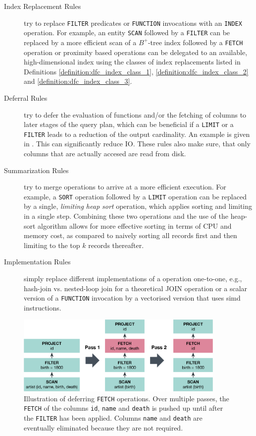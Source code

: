 \begin{description}
    \item[Index Replacement Rules] try to replace \texttt{FILTER} predicates or \texttt{FUNCTION} invocations with an  \texttt{INDEX} operation. For example, an entity \texttt{SCAN} followed by a \texttt{FILTER} can be replaced by a more efficient scan of a $B^{+}$-tree index followed by a \texttt{FETCH} operation or proximity based operations can be delegated to an available, high-dimensional index using the classes of index replacements listed in Definitions \ref{definition:dfc_index_class_1}, \ref{definition:dfc_index_class_2} and \ref{definition:dfc_index_class_3}.
 
    \item[Deferral Rules] try to defer the evaluation of functions and/or the fetching of columns to later stages of the query plan, which can be beneficial if a \texttt{LIMIT} or a \texttt{FILTER} leads to a reduction of the output cardinality. An example is given in . This can significantly reduce IO. These rules also make sure, that only columns that are actually accesed are read from disk.

    \item[Summarization Rules]try to merge operations to arrive at a more efficient execution. For example, a \texttt{SORT} operation followed by a  \texttt{LIMIT} operation can be replaced by a single, \emph{limiting heap sort} operation, which applies sorting and limiting in a single step. Combining these two operations and the use of the heap-sort algorithm allows for more effective sorting in terms of CPU and memory cost, as compared to naively sorting all records first and then limiting to the top $k$ records thereafter.
    
    \item[Implementation Rules] simply replace different implementations of a operation one-to-one, e.g., hash-join vs. nested-loop join for a theoretical JOIN operation or a scalar version of a \texttt{FUNCTION} invocation by a vectorised version that uses \acrshort{simd} instructions.
\end{description}


\begin{figure}[bt]
    \centering
    \includegraphics[width=0.9\textwidth]{figures/physical-rule-fetch}
    \caption{Illustration of deferring \texttt{FETCH} operations. Over multiple passes, the \texttt{FETCH} of the columns \texttt{id}, \texttt{name} and \texttt{death} is pushed up until after the \texttt{FILTER} has been applied. Columns \texttt{name} and \texttt{death} are eventually eliminated because they are not required.}
    \label{figure:cottontail_physical_rule_fetch}
\end{figure}

